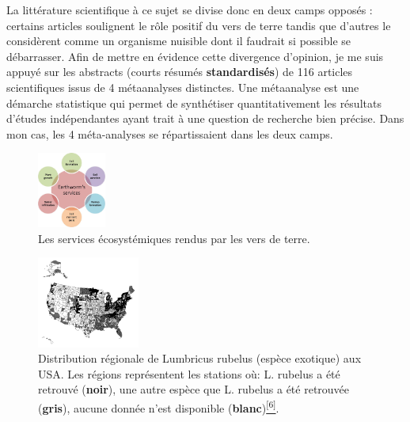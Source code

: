 \documentclass{book}
\begin{document}
La littérature scientifique à ce sujet se divise donc en deux camps opposés : certains articles soulignent le rôle positif du vers de terre tandis que d'autres le considèrent comme un organisme nuisible dont il faudrait si possible se débarrasser.  Afin de mettre en évidence cette divergence d'opinion, je me suis appuyé sur les abstracts (courts résumés \textbf{standardisés}) de 116 articles scientifiques issus de 4 métaanalyses distinctes. Une métaanalyse est une démarche statistique qui permet de synthétiser quantitativement les résultats d'études indépendantes ayant trait à une question de recherche bien précise. Dans mon cas, les 4 méta-analyses se répartissaient dans les deux camps.  





\noindent

\begin{figure}[htb] %
    \begin{center} %
        \includegraphics[width=0.2\textwidth]{EW_services.png}
        \caption{Les services écosystémiques rendus par les vers de terre.}\label{fig_wormsservices}
    \end{center}
\end{figure}

\begin{figure}[htb] %
    \begin{center} %
        \includegraphics[width=0.3\textwidth]{worm-map.png}
        \caption[Distribution régionale de Lumbricus rubelus (espèce exotique) aux USA.]{Distribution régionale de Lumbricus rubelus (espèce exotique) aux USA. Les régions représentent les stations où: L. rubelus a été retrouvé (\textbf{noir}), une autre espèce que L. rubelus a été retrouvée (\textbf{gris}), aucune donnée n'est disponible (\textbf{blanc})\hyperref[site4]{\textsuperscript{[6]}}.}\label{fig_wormmap}
    \end{center} 
\end{figure}
\end{document}
